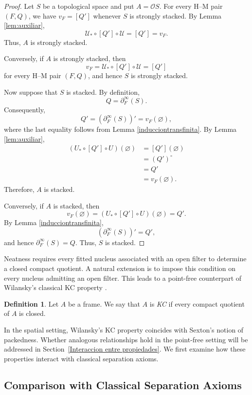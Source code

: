 \documentclass[11pt]{amsart}
\theoremstyle{plain}
\theoremstyle{definition}
\newtheorem{dfn}[thm]{Definition}
\begin{document}
\begin{proof}
Let $S$ be a topological space and put
$A=\mathcal OS$. For every H--M pair $(F,Q)$,
we have $v_F=[Q']$ whenever $S$ is strongly
stacked. By Lemma \ref{lem:auxiliar},
\[
\mathcal{U}_*\circ[Q']\circ \mathcal{U}=[Q']=v_F.
\]
Thus, $A$ is strongly stacked.

Conversely, if $A$ is strongly stacked, then
\[
v_F=\mathcal{U}_*\circ[Q']\circ \mathcal{U}=[Q']
\]
for every H--M pair $(F,Q)$, and hence $S$
is strongly stacked.

Now suppose that $S$ is stacked. By definition,
\[
Q=\partial_F^\infty(S).
\]
Consequently,
\[
Q'=(\partial_F^\infty(S))'
   =v_F(\varnothing),
\]
where the last equality follows from Lemma \ref{inducciontransfinita}.
By Lemma \ref{lem:auxiliar},
\[
\begin{aligned}
(U_*\circ[Q']\circ U)(\varnothing)
 &=[Q'](\varnothing)\\
 &=(Q')^\circ\\
 &=Q'\\
 &=v_F(\varnothing).
\end{aligned}
\]
Therefore, $A$ is stacked.

Conversely, if $A$ is stacked, then
\[
v_F(\varnothing)
 =(U_*\circ[Q']\circ U)(\varnothing)
 =Q'.
\]
By Lemma \ref{inducciontransfinita},
\[
(\partial_F^\infty(S))'=Q',
\]
and hence $\partial_F^\infty(S)=Q$.
Thus, $S$ is stacked.
\end{proof}


Neatness requires every fitted nucleus associated
with an open filter to determine a closed compact
quotient. A natural extension is to impose this
condition on every nucleus admitting an open filter.
This leads to a point-free counterpart of Wilansky's
classical KC property \cite{Wilansky1967}.

\begin{dfn}\label{DefKC}
Let $A$ be a frame. We say that $A$ is \emph{KC} if every compact quotient of $A$ is closed.
\end{dfn}


In the spatial setting, Wilansky's KC property
coincides with Sexton's notion of packedness.
Whether analogous relationships hold in the
point-free setting will be addressed in Section~\ref{Interaccion entre propiedades}.
We first examine how these properties interact
with classical separation axioms.


\subsection{Comparison with Classical Separation Axioms}\label{RelacionConPropiedadesDeSeparacion}
\end{document}
